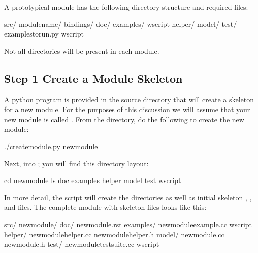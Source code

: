 \documentclass[letterpaper,10pt,english]{sphinxmanual}
\renewcommand{\sphinxcode}[1]{\texttt{\small{#1}}}
\begin{document}
A prototypical module has the following directory structure and
required files:

\begin{sphinxVerbatim}[commandchars=\\\{\}]
src/
  module\PYGZhy{}name/
    bindings/
    doc/
    examples/
      wscript
    helper/
    model/
    test/
      examples\PYGZhy{}to\PYGZhy{}run.py
    wscript
\end{sphinxVerbatim}

Not all directories will be present in each module.


\subsection{Step 1 \sphinxhyphen{} Create a Module Skeleton}
\label{\detokenize{new-modules:step-1-create-a-module-skeleton}}
A python program is provided in the source directory that
will create a skeleton for a new module.  For the purposes
of this discussion we will assume that your new module
is called \sphinxcode{}.  From the \sphinxcode{} directory, do the following
to create the new module:

\begin{sphinxVerbatim}[commandchars=\\\{\}]
\PYGZdl{} ./create\PYGZhy{}module.py new\PYGZhy{}module
\end{sphinxVerbatim}

Next, \sphinxcode{} into \sphinxcode{}; you will find this directory layout:

\begin{sphinxVerbatim}[commandchars=\\\{\}]
\PYGZdl{} cd new\PYGZhy{}module
\PYGZdl{} ls
doc examples  helper  model  test  wscript
\end{sphinxVerbatim}

In more detail, the \sphinxcode{} script will create the
directories as well as initial skeleton \sphinxcode{}, \sphinxcode{}, \sphinxcode{}
and \sphinxcode{} files.  The complete module with skeleton files looks like this:

\begin{sphinxVerbatim}[commandchars=\\\{\}]
src/
  new\PYGZhy{}module/
    doc/
      new\PYGZhy{}module.rst
    examples/
      new\PYGZhy{}module\PYGZhy{}example.cc
      wscript
    helper/
      new\PYGZhy{}module\PYGZhy{}helper.cc
      new\PYGZhy{}module\PYGZhy{}helper.h
    model/
      new\PYGZhy{}module.cc
      new\PYGZhy{}module.h
    test/
      new\PYGZhy{}module\PYGZhy{}test\PYGZhy{}suite.cc
    wscript
\end{sphinxVerbatim}
\end{document}
